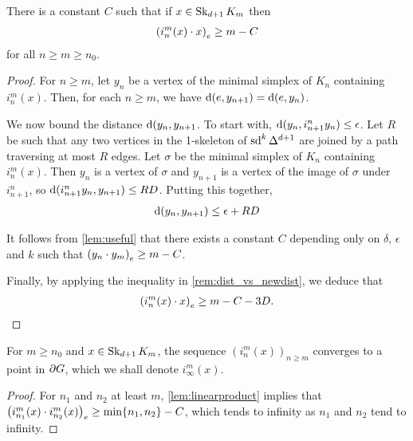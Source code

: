 \documentclass[a4paper]{article}
\begin{document}
\begin{lemma}\label{lem:linearproduct}
  There is a constant $C$ such that if $x \in \Skel_{d+1} K_m$ then
  \begin{align*}
    \gromov{e}{i^m_n(x)}{x} \geq m - C
  \end{align*}
  for all $n\geq m\geq n_0$.
\end{lemma}

\begin{proof}
  For $n \geq m$, let $y_n$ be a vertex of the minimal simplex of $K_n$
  containing $i^m_n(x)$. Then, for each $n \geq m$, we have $\dist(e, y_{n+1})
  = \dist(e, y_n)$. 

  We now bound the distance $\dist(y_n, y_{n+1}$. To start with, $\dist(y_n,
  i^n_{n+1} y_n) \leq \epsilon$. Let $R$ be such that any two vertices in the
  1-skeleton of $\sd^k \Delta^{d+1}$ are joined by a path traversing at most
  $R$ edges. Let $\sigma$ be the minimal simplex of $K_n$ containing
  $i^m_n(x)$. Then $y_n$ is a vertex of $\sigma$ and $y_{n+1}$ is a vertex of
  the image of $\sigma$ under $i^n_{n+1}$, so $\dist(i^n_{n+1} y_n, y_{n+1})
  \leq RD$.  Putting this together,
  \begin{align*}
      \dist(y_n, y_{n+1}) \leq \epsilon + RD
  \end{align*}

  It follows from \cref{lem:useful} that there exists a constant $C$ depending
  only on $\delta$, $\epsilon$ and $k$ such that $\gromov{e}{y_n}{y_m} \geq m -
  C$.

  Finally, by applying the inequality in \cref{rem:dist_vs_newdist}, we deduce
  that
  \begin{align*}
      \gromov{e}{i^m_n(x)}{x} \geq m - C - 3D.\qedhere
  \end{align*}
\end{proof}

\begin{corollary}
  For $m \geq n_0$ and $x \in \Skel_{d+1} K_m$, the sequence
  $(i^m_n(x))_{n\geq m}$ converges to a point in $\boundary G$, which we shall
  denote $i^m_\infty(x)$.
\end{corollary}

\begin{proof}
  For $n_1$ and $n_2$ at least $m$, \cref{lem:linearproduct} implies that
  $\gromov{e}{i^m_{n_1}(x)}{i^m_{n_2}(x)} \geq \min\{n_1,n_2\} - C$, which
  tends to infinity as $n_1$ and $n_2$ tend to infinity.
\end{proof}
\end{document}

